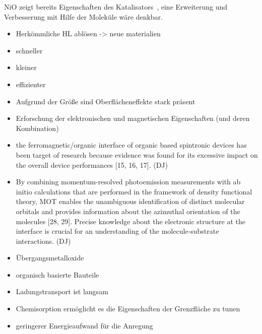     NiO zeigt bereits Eigenschaften des Katalisators~\cite{kunz_chemisorption_1985}, eine Erweiterung und Verbesserung mit Hilfe der Moleküle wäre denkbar.
\begin{itemize}
    \item Herkömmliche HL ablösen -> neue materialien
    \item schneller
    \item kleiner
    \item effizienter
    \item Aufgrund der Größe sind Oberflächeneffekte stark präsent
    \item Erforschung der elektronischen und magnetischen Eigenschaften (und deren Kombination)
    \item the ferromagnetic/organic interface of organic     based spintronic devices has been target of research because evidence was found for its excessive impact on the overall device performances [15, 16, 17]. (DJ)
    \item By combining momentum-resolved photoemission measurements with ab initio calculations that are performed in the framework of density functional theory, MOT enables the unambiguous identification of distinct molecular orbitals and provides information about the azimuthal orientation of the molecules [28, 29]. Precise knowledge about the electronic structure at the interface is crucial for an understanding of the molecule-substrate interactions. (DJ)
    \item Übergangsmetalloxide
    \item organisch basierte Bauteile
    \item Ladungstransport ist langsam
    \item Chemisorption ermöglicht es die Eigenschaften der Grenzfläche zu tunen
    \item geringerer Energieaufwand für die Anregung
\end{itemize}